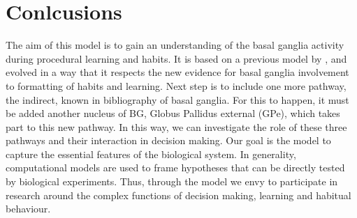 \section{Conlcusions}

	The aim of this model is to gain an understanding of the basal ganglia activity during procedural learning and habits. It is based on a previous model by \citet{Guthrie2013}, and evolved in a way that it respects the new evidence for basal ganglia involvement to formatting of habits and learning. Next step is to include one more pathway, the indirect, known in bibliography of basal ganglia. For this to happen, it must be added another nucleus of BG, Globus Pallidus external (GPe), which takes part to this new pathway. In this way, we can investigate the role of these three pathways and their interaction in decision making. Our goal is the model to capture the essential features of the biological system. In generality, computational models are used to frame hypotheses that can be directly tested by biological experiments. Thus, through the model we envy to participate in research around the complex functions of decision making, learning and habitual behaviour.